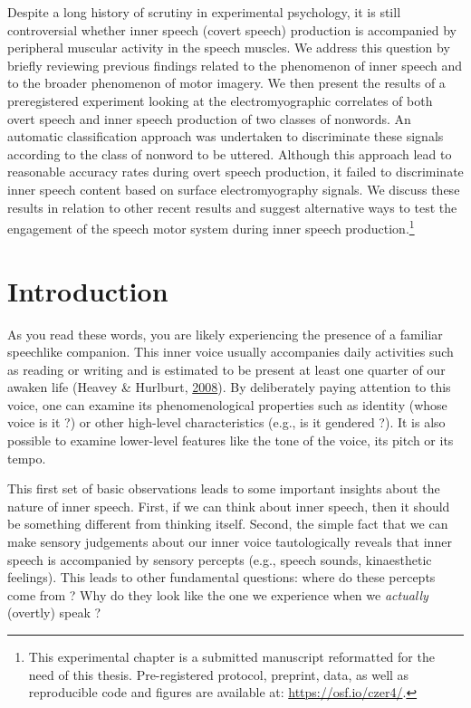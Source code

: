 \documentclass[a4paper,12pt,twoside,onecolumn,openright,final,oldfontcommands]{memoir}
\let\rmarkdownfootnote\footnote%
\def\footnote{\protect\rmarkdownfootnote}
\newcommand{\initial}[1]{
	\lettrine[lines=3,lhang=0.33,nindent=0em]{
		\color{gray}
     		{\textsc{#1}}}{}}
\begin{document}
\initial{D}espite a long history of scrutiny in experimental psychology, it is still controversial whether inner speech (covert speech) production is accompanied by peripheral muscular activity in the speech muscles. We address this question by briefly reviewing previous findings related to the phenomenon of inner speech and to the broader phenomenon of motor imagery. We then present the results of a preregistered experiment looking at the electromyographic correlates of both overt speech and inner speech production of two classes of nonwords. An automatic classification approach was undertaken to discriminate these signals according to the class of nonword to be uttered. Although this approach lead to reasonable accuracy rates during overt speech production, it failed to discriminate inner speech content based on surface electromyography signals. We discuss these results in relation to other recent results and suggest alternative ways to test the engagement of the speech motor system during inner speech production.\footnote{This experimental chapter is a submitted manuscript reformatted for the need of this thesis. Pre-registered protocol, preprint, data, as well as reproducible code and figures are available at: \url{https://osf.io/czer4/}.}

\hypertarget{introduction-2}{%
\section{Introduction}\label{introduction-2}}

As you read these words, you are likely experiencing the presence of a familiar speechlike companion. This inner voice usually accompanies daily activities such as reading or writing and is estimated to be present at least one quarter of our awaken life (Heavey \& Hurlburt, \protect\hyperlink{ref-heavey_phenomena_2008}{2008}). By deliberately paying attention to this voice, one can examine its phenomenological properties such as identity (whose voice is it ?) or other high-level characteristics (e.g., is it gendered ?). It is also possible to examine lower-level features like the tone of the voice, its pitch or its tempo.

This first set of basic observations leads to some important insights about the nature of inner speech. First, if we can think about inner speech, then it should be something different from thinking itself. Second, the simple fact that we can make sensory judgements about our inner voice tautologically reveals that inner speech is accompanied by sensory percepts (e.g., speech sounds, kinaesthetic feelings). This leads to other fundamental questions: where do these percepts come from ? Why do they look like the one we experience when we \emph{actually} (overtly) speak ?
\end{document}
